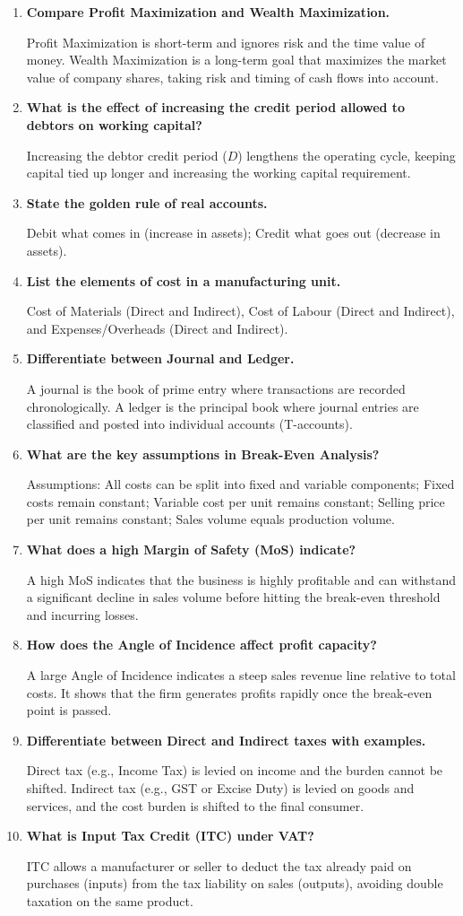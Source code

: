\documentclass[12pt,a4paper]{article}
\newcommand{\Q}[1]{\textbf{#1}\par\noindent\ignorespaces}
\begin{document}
\begin{tcolorbox}[exambox, title={\textbf{Frequently Asked / Viva Questions}}]
\begin{enumerate}[topsep=0pt, label=\textbf{Q\arabic*.}, itemsep=5pt]
  \item \Q{Compare Profit Maximization and Wealth Maximization.}
    Profit Maximization is short-term and ignores risk and the time value of money. Wealth Maximization is a long-term goal that maximizes the market value of company shares, taking risk and timing of cash flows into account.
  \item \Q{What is the effect of increasing the credit period allowed to debtors on working capital?}
    Increasing the debtor credit period ($D$) lengthens the operating cycle, keeping capital tied up longer and increasing the working capital requirement.
  \item \Q{State the golden rule of real accounts.}
    Debit what comes in (increase in assets); Credit what goes out (decrease in assets).
  \item \Q{List the elements of cost in a manufacturing unit.}
    Cost of Materials (Direct and Indirect), Cost of Labour (Direct and Indirect), and Expenses/Overheads (Direct and Indirect).
  \item \Q{Differentiate between Journal and Ledger.}
    A journal is the book of prime entry where transactions are recorded chronologically. A ledger is the principal book where journal entries are classified and posted into individual accounts (T-accounts).
  \item \Q{What are the key assumptions in Break-Even Analysis?}
    Assumptions: All costs can be split into fixed and variable components; Fixed costs remain constant; Variable cost per unit remains constant; Selling price per unit remains constant; Sales volume equals production volume.
  \item \Q{What does a high Margin of Safety (MoS) indicate?}
    A high MoS indicates that the business is highly profitable and can withstand a significant decline in sales volume before hitting the break-even threshold and incurring losses.
  \item \Q{How does the Angle of Incidence affect profit capacity?}
    A large Angle of Incidence indicates a steep sales revenue line relative to total costs. It shows that the firm generates profits rapidly once the break-even point is passed.
  \item \Q{Differentiate between Direct and Indirect taxes with examples.}
    Direct tax (e.g., Income Tax) is levied on income and the burden cannot be shifted. Indirect tax (e.g., GST or Excise Duty) is levied on goods and services, and the cost burden is shifted to the final consumer.
  \item \Q{What is Input Tax Credit (ITC) under VAT?}
    ITC allows a manufacturer or seller to deduct the tax already paid on purchases (inputs) from the tax liability on sales (outputs), avoiding double taxation on the same product.
  \end{enumerate}
\end{tcolorbox}
\end{document}

